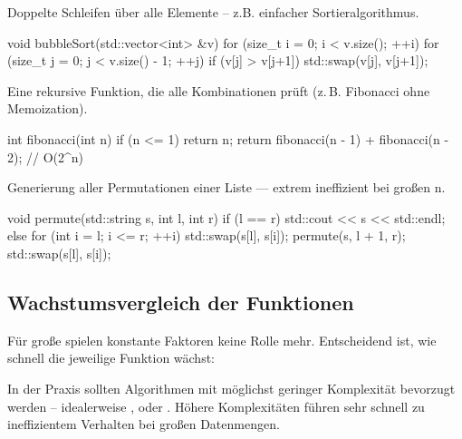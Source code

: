 \begin{tcolorbox}[blue, title={Beispiel 5 — quadratische Komplexität \rCode{$O(n^2)$}}]
    Doppelte Schleifen über alle Elemente – z.B. einfacher Sortieralgorithmus.
\end{tcolorbox}

\begin{cpp}
void bubbleSort(std::vector<int> &v) {
    for (size_t i = 0; i < v.size(); ++i)
        for (size_t j = 0; j < v.size() - 1; ++j)
            if (v[j] > v[j+1])
                std::swap(v[j], v[j+1]);
}
\end{cpp}

\begin{tcolorbox}[blue, title={Beispiel 6 — exponentielle Komplexität \rCode{$O(2^n)$}}]
    Eine rekursive Funktion, die alle Kombinationen prüft (z.\,B. Fibonacci ohne Memoization).
\end{tcolorbox}

\begin{cpp}
int fibonacci(int n) {
    if (n <= 1) return n;
    return fibonacci(n - 1) + fibonacci(n - 2); // O(2^n)
}
\end{cpp}

\begin{tcolorbox}[blue, title={Beispiel 7 — Fakultätskomplexität \rCode{$O(n!)$}}]
    Generierung aller Permutationen einer Liste — extrem ineffizient bei großen n.
\end{tcolorbox}

\begin{cpp}
void permute(std::string s, int l, int r) {
    if (l == r) std::cout << s << std::endl;
    else {
        for (int i = l; i <= r; ++i) {
            std::swap(s[l], s[i]);
            permute(s, l + 1, r);
            std::swap(s[l], s[i]);
        }
    }
}
\end{cpp}

\subsection{Wachstumsvergleich der Funktionen}

    Für große  spielen konstante Faktoren keine Rolle mehr.  
    Entscheidend ist, wie schnell die jeweilige Funktion wächst:

    \begin{center}
    \end{center}

    \begin{tcolorbox}[red, title={Fazit}]
        In der Praxis sollten Algorithmen mit möglichst geringer Komplexität bevorzugt werden – 
        idealerweise ,  oder .  
        Höhere Komplexitäten führen sehr schnell zu ineffizientem Verhalten bei großen Datenmengen.
    \end{tcolorbox}

